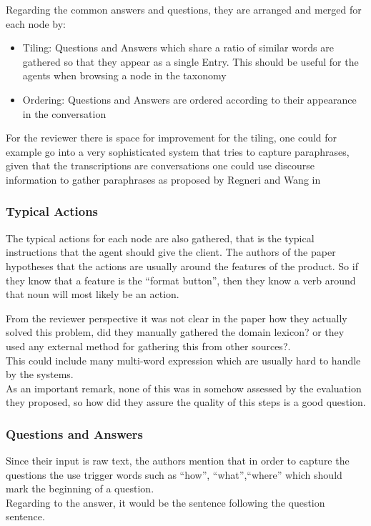 \documentclass[4pt,a4paper,twocolumn]{article}
\begin{document}
Regarding the common answers and questions, they are arranged and merged for each node by:
\begin{itemize}
	\item Tiling:  Questions and Answers which share a ratio of similar words are gathered so that they appear as a single
				  Entry. This should be useful for the agents when browsing a node in the taxonomy
	\item Ordering: Questions and Answers are ordered according to their appearance in the conversation
\end{itemize}


For the reviewer there is space for improvement for the tiling, one could for example go into a very sophisticated system that tries to capture paraphrases, given that the transcriptions are conversations one could use discourse information to gather paraphrases as proposed by Regneri and Wang in ~\cite{pub6382}

\subsubsection*{Typical Actions}
The typical actions for each node are also gathered, that is the typical instructions that the agent should give the client.
The authors of the paper hypotheses that the actions are usually around the features of the product. So if they know that a feature is the ``format button'', then they know a verb around that noun will most likely  be an action.

From the reviewer perspective it was not clear in the paper how they actually solved this problem, did they manually gathered the domain lexicon? or they used any external method for gathering this from other sources?.\\
This could include many multi-word expression which are usually hard to handle by the systems.\\
As an important remark, none of this was in somehow assessed by the evaluation they proposed, so how did they assure the quality of this steps is a  good question.


\subsubsection*{Questions and Answers}
Since their input is raw text, the authors mention that in order to capture the questions the use trigger words such as ``how'', ``what'',``where'' which should mark the beginning of a question.\\
Regarding to the answer, it would be the sentence following the question sentence.
\end{document}
